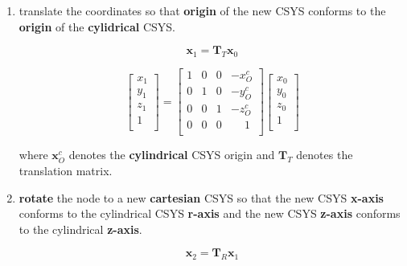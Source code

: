 \documentclass[10pt,b5paper,titlepage]{book}
\newcommand{\m}{\mathbf}
\begin{document}
 \begin{enumerate}
     \item translate the coordinates so that \textbf{origin} of the new
         CSYS conforms to the \textbf{origin} of the \textbf{cylidrical}
         CSYS.

         \begin{equation}
             \m{x}_1 = \m{T}_T \m{x}_0
         \end{equation}

         \begin{equation}
             \begin{bmatrix}
                 x_1 \\
                 y_1 \\
                 z_1 \\
                 1 \\
             \end{bmatrix}
             = \begin{bmatrix}
                 1 & 0 & 0 & -x_O^c \\
                 0 & 1 & 0 & -y_O^c \\
                 0 & 0 & 1 & -z_O^c \\
                 0 & 0 & 0 & \phantom{-}1 \\
             \end{bmatrix}
             \begin{bmatrix}
                 x_0 \\
                 y_0 \\
                 z_0 \\
                 1 \\
             \end{bmatrix}
         \end{equation}

         where $ \m{x}_O^c $ denotes the \textbf{cylindrical} CSYS origin
         and $ \m{T}_T $ denotes the translation matrix.

    \item \textbf{rotate} the node to a new \textbf{cartesian} CSYS so that
        the new CSYS \textbf{x-axis} conforms to the cylindrical CSYS
        \textbf{r-axis} and the new CSYS \textbf{z-axis} conforms to the
        cylindrical \textbf{z-axis}.

        \begin{equation}
            \m{x}_2 = \m{T}_R \m{x}_1
        \end{equation}


\end{enumerate}
\end{document}
